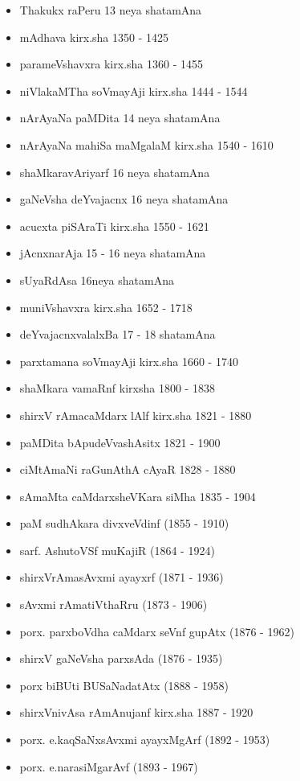{\begin{itemize}
\item Thakukx raPeru {\rm 13} neya shatamAna
\item mAdhava kirx.sha {\rm 1350 - 1425}
\item parameVshavxra kirx.sha {\rm 1360 - 1455}
\item niVlakaMTha soVmayAji kirx.sha {\rm 1444 - 1544}
\item nArAyaNa paMDita {\rm 14} neya shatamAna
\item nArAyaNa mahiSa maMgalaM kirx.sha {\rm 1540 - 1610}
\item shaMkaravAriyarf {\rm 16} neya shatamAna
\item gaNeVsha deYvajacnx {\rm 16} neya shatamAna
\item acucxta piSAraTi kirx.sha {\rm 1550 - 1621}
\item jAcnxnarAja {\rm 15 - 16} neya shatamAna
\item sUyaRdAsa {\rm 16}neya shatamAna
\item muniVshavxra kirx.sha {\rm 1652 - 1718}
\item deYvajacnxvalalxBa {\rm 17 - 18} shatamAna
\item parxtamana soVmayAji kirx.sha {\rm 1660 - 1740}
\item shaMkara vamaRnf kirxsha {\rm 1800 - 1838}
\item shirxV rAmacaMdarx lAlf kirx.sha {\rm 1821 - 1880}
\item paMDita bApudeVvashAsitx {\rm 1821 - 1900}
\item ciMtAmaNi raGunAthA cAyaR {\rm 1828 - 1880}
\item sAmaMta caMdarxsheVKara siMha {\rm 1835 - 1904}
\item paM sudhAkara divxveVdinf {\rm (1855 - 1910)}
\item sarf. AshutoVSf muKajiR {\rm (1864 - 1924)}
\item shirxVrAmasAvxmi ayayxrf {\rm (1871 - 1936)}
\item sAvxmi rAmatiVthaRru {\rm (1873 - 1906)}
\item porx. parxboVdha caMdarx seVnf gupAtx {\rm (1876 - 1962)}
\item shirxV gaNeVsha parxsAda {\rm (1876 - 1935)}
\item porx biBUti BUSaNadatAtx {\rm (1888 - 1958)}
\item shirxVnivAsa rAmAnujanf kirx.sha {\rm 1887 - 1920}
\item porx. e.kaqSaNxsAvxmi ayayxMgArf {\rm (1892 - 1953)}
\item porx. e.narasiMgarAvf {\rm (1893 - 1967)}

\end{itemize}}
